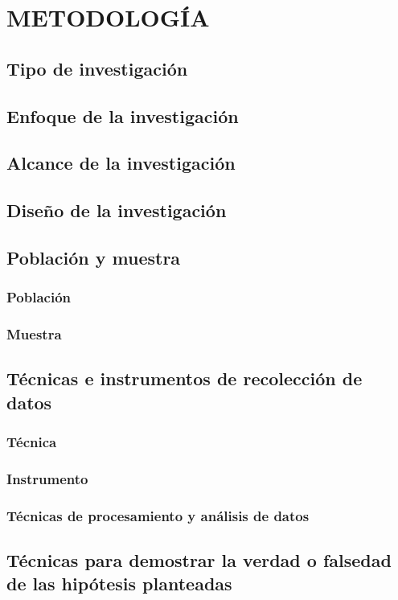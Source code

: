 \newpage
\chapter{METODOLOGÍA}
\section{Tipo de investigación}

\lipsum[1]

\section{Enfoque de la investigación}

\lipsum[1]

\section{Alcance de la investigación}

\lipsum[1]

\section{Diseño de la investigación}

\lipsum[1]

\section{Población y muestra}
\subsection{Población}

\lipsum[1]

\subsection{Muestra}

\lipsum[1]

\section{Técnicas e instrumentos de recolección de datos}

\lipsum[1]

\subsection{Técnica}

\lipsum[1]

\subsection{Instrumento}

\lipsum[1]

\subsection{Técnicas de procesamiento y análisis de datos}

\lipsum[1]

\section{Técnicas para demostrar la verdad o falsedad de las hipótesis planteadas}

\lipsum[1-2]
